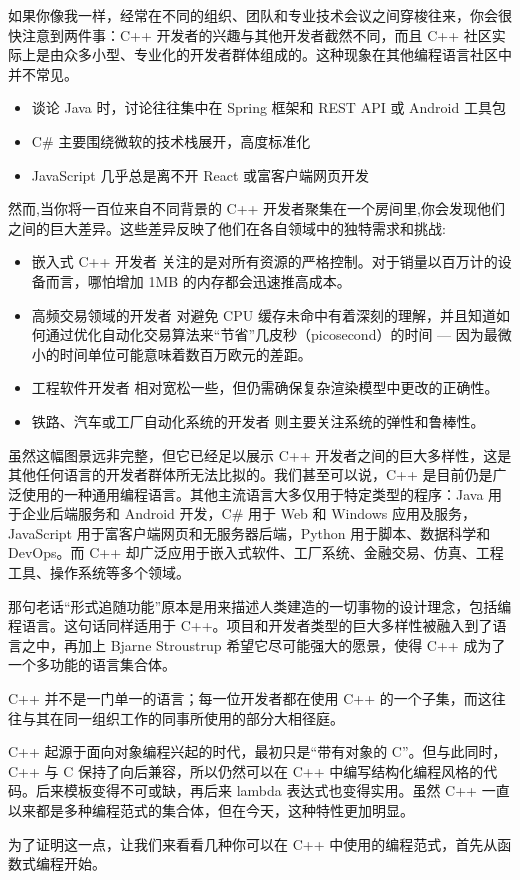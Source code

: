 
如果你像我一样，经常在不同的组织、团队和专业技术会议之间穿梭往来，你会很快注意到两件事：C++ 开发者的兴趣与其他开发者截然不同，而且 C++ 社区实际上是由众多小型、专业化的开发者群体组成的。这种现象在其他编程语言社区中并不常见。

\begin{itemize}
\item 
谈论 Java 时，讨论往往集中在 Spring 框架和 REST API 或 Android 工具包

\item 
C\# 主要围绕微软的技术栈展开，高度标准化

\item 
JavaScript 几乎总是离不开 React 或富客户端网页开发
\end{itemize}

然而,当你将一百位来自不同背景的 C++ 开发者聚集在一个房间里,你会发现他们之间的巨大差异。这些差异反映了他们在各自领域中的独特需求和挑战:

\begin{itemize}
\item 
嵌入式 C++ 开发者 关注的是对所有资源的严格控制。对于销量以百万计的设备而言，哪怕增加 1MB 的内存都会迅速推高成本。

\item 
高频交易领域的开发者 对避免 CPU 缓存未命中有着深刻的理解，并且知道如何通过优化自动化交易算法来“节省”几皮秒（picosecond）的时间 --- 因为最微小的时间单位可能意味着数百万欧元的差距。

\item 
工程软件开发者 相对宽松一些，但仍需确保复杂渲染模型中更改的正确性。

\item 
铁路、汽车或工厂自动化系统的开发者 则主要关注系统的弹性和鲁棒性。
\end{itemize}

虽然这幅图景远非完整，但它已经足以展示 C++ 开发者之间的巨大多样性，这是其他任何语言的开发者群体所无法比拟的。我们甚至可以说，C++ 是目前仍是广泛使用的一种通用编程语言。其他主流语言大多仅用于特定类型的程序：Java 用于企业后端服务和 Android 开发，C\# 用于 Web 和 Windows 应用及服务，JavaScript 用于富客户端网页和无服务器后端，Python 用于脚本、数据科学和 DevOps。而 C++ 却广泛应用于嵌入式软件、工厂系统、金融交易、仿真、工程工具、操作系统等多个领域。

那句老话“形式追随功能”原本是用来描述人类建造的一切事物的设计理念，包括编程语言。这句话同样适用于 C++。项目和开发者类型的巨大多样性被融入到了语言之中，再加上 Bjarne Stroustrup 希望它尽可能强大的愿景，使得 C++ 成为了一个多功能的语言集合体。

C++ 并不是一门单一的语言；每一位开发者都在使用 C++ 的一个子集，而这往往与其在同一组织工作的同事所使用的部分大相径庭。

C++ 起源于面向对象编程兴起的时代，最初只是“带有对象的 C”。但与此同时，C++ 与 C 保持了向后兼容，所以仍然可以在 C++ 中编写结构化编程风格的代码。后来模板变得不可或缺，再后来 lambda 表达式也变得实用。虽然 C++ 一直以来都是多种编程范式的集合体，但在今天，这种特性更加明显。

为了证明这一点，让我们来看看几种你可以在 C++ 中使用的编程范式，首先从函数式编程开始。
